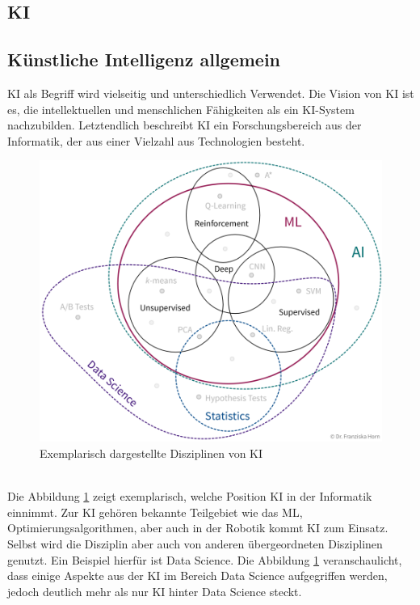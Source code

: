 \begin{onehalfspace}
    \newpage
    \section{\ac{KI}}
    \label{subsec:KIandML}
    \subsection{Künstliche Intelligenz allgemein}
    \label{subsubsec:KIAllgemein}
        \ac{KI} als Begriff wird vielseitig und unterschiedlich Verwendet. Die Vision von \ac{KI} ist es, die intellektuellen und menschlichen Fähigkeiten als ein KI-System nachzubilden.\cite{Lis2019} Letztendlich beschreibt \ac{KI} ein Forschungsbereich aus der Informatik, der aus einer Vielzahl aus Technologien besteht.\cite{HEGKI2019Definition} 
        \begin{figure}[h]
            \centering
            \includegraphics[width = \textwidth]{Bilder/ml_toolset.png}
            \caption{Exemplarisch dargestellte Disziplinen von \ac{KI}\cite{Horn2022}}
            \label{fig:ml_toolset}
        \end{figure}
        \\
        Die Abbildung \ref*{fig:ml_toolset} zeigt exemplarisch, welche Position \ac*{KI} in der Informatik einnimmt. Zur \ac{KI} gehören bekannte Teilgebiet wie das \ac*{ML}, Optimierungsalgorithmen, aber auch  in der Robotik kommt \ac{KI} zum Einsatz. Selbst wird die Disziplin aber auch von anderen übergeordneten Disziplinen genutzt.\cite{HEGKI2019Definition} Ein Beispiel hierfür ist Data Science. Die Abbildung \ref*{fig:ml_toolset} veranschaulicht, dass einige Aspekte aus der \ac{KI} im Bereich Data Science aufgegriffen werden, jedoch deutlich mehr als nur \ac{KI} hinter Data Science steckt.

\end{onehalfspace}
